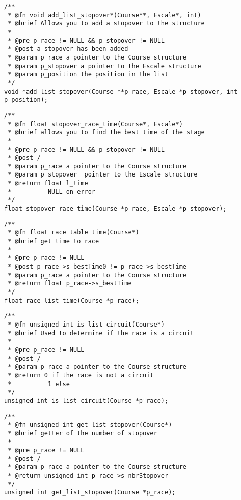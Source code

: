 \documentclass[a4paper, 11pt, oneside]{article}
\begin{document}
		\begin{lstlisting}
/**
 * @fn void add_list_stopover*(Course**, Escale*, int)
 * @brief Allows you to add a stopover to the structure
 *
 * @pre p_race != NULL && p_stopover != NULL
 * @post a stopover has been added
 * @param p_race a pointer to the Course structure
 * @param p_stopover a pointer to the Escale structure
 * @param p_position the position in the list
 */
void *add_list_stopover(Course **p_race, Escale *p_stopover, int p_position);
		\end{lstlisting}
	
		\begin{lstlisting}
/**
 * @fn float stopover_race_time(Course*, Escale*)
 * @brief allows you to find the best time of the stage
 *
 * @pre p_race != NULL && p_stopover != NULL
 * @post /
 * @param p_race a pointer to the Course structure
 * @param p_stopover  pointer to the Escale structure
 * @return float l_time
 * 			NULL on error
 */
float stopover_race_time(Course *p_race, Escale *p_stopover);
		\end{lstlisting}
		
\newpage
		\begin{lstlisting}
/**
 * @fn float race_table_time(Course*)
 * @brief get time to race
 *
 * @pre p_race != NULL
 * @post p_race->s_bestTime0 != p_race->s_bestTime
 * @param p_race a pointer to the Course structure
 * @return float p_race->s_bestTime
 */
float race_list_time(Course *p_race);
		\end{lstlisting}
		
		\begin{lstlisting}
/**
 * @fn unsigned int is_list_circuit(Course*)
 * @brief Used to determine if the race is a circuit
 *
 * @pre p_race != NULL
 * @post /
 * @param p_race a pointer to the Course structure
 * @return 0 if the race is not a circuit
 * 			1 else
 */
unsigned int is_list_circuit(Course *p_race);
		\end{lstlisting}
		
		\begin{lstlisting}
/**
 * @fn unsigned int get_list_stopover(Course*)
 * @brief getter of the number of stopover
 *
 * @pre p_race != NULL
 * @post /
 * @param p_race a pointer to the Course structure
 * @return unsigned int p_race->s_nbrStopover
 */
unsigned int get_list_stopover(Course *p_race);
		\end{lstlisting}
		
\end{document}
